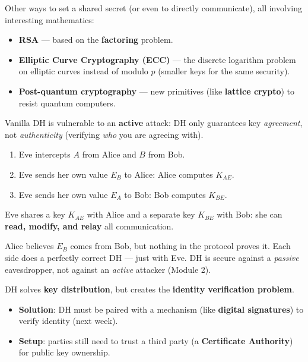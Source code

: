 \begin{rembox}[title=Beyond DH]
Other ways to set a shared secret (or even to directly communicate), all involving
interesting mathematics:
\begin{itemize}
  \item \textbf{RSA} --- based on the \textbf{factoring} problem.
  \item \textbf{Elliptic Curve Cryptography (ECC)} --- the discrete logarithm problem on
        elliptic curves instead of modulo $p$ (smaller keys for the same security).
  \item \textbf{Post-quantum cryptography} --- new primitives (like \textbf{lattice
        crypto}) to resist quantum computers.
\end{itemize}
\end{rembox}

\begin{defnbox}[title=Man-In-The-Middle (MITM) attack]
Vanilla DH is vulnerable to an \textbf{active} attack: DH only guarantees key
\emph{agreement}, not \emph{authenticity} (verifying \emph{who} you are agreeing with).
\begin{enumerate}
  \item Eve intercepts $A$ from Alice and $B$ from Bob.
  \item Eve sends her own value $E_B$ to Alice: Alice computes $K_{AE}$.
  \item Eve sends her own value $E_A$ to Bob: Bob computes $K_{BE}$.
\end{enumerate}
Eve shares a key $K_{AE}$ with Alice and a separate key $K_{BE}$ with Bob: she can
\textbf{read, modify, and relay} all communication.
\end{defnbox}

\begin{rembox}[title=Why it works]
Alice believes $E_B$ comes from Bob, but nothing in the protocol proves it. Each side
does a perfectly correct DH --- just with Eve. DH is secure against a \emph{passive}
eavesdropper, not against an \emph{active} attacker (Module 2).
\end{rembox}

\begin{defnbox}[title=Identity verification problem]
DH solves \textbf{key distribution}, but creates the \textbf{identity verification
problem}.
\begin{itemize}
  \item \textbf{Solution}: DH must be paired with a mechanism (like \textbf{digital
        signatures}) to verify identity (next week).
  \item \textbf{Setup}: parties still need to trust a third party (a
        \textbf{Certificate Authority}) for public key ownership.
\end{itemize}
\end{defnbox}

